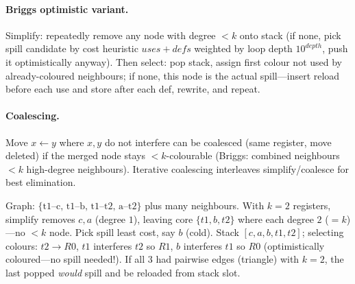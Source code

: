 \paragraph{Briggs optimistic variant.} Simplify: repeatedly remove any node with degree $<k$ onto stack (if none, pick spill candidate by cost heuristic $uses+defs$ weighted by loop depth $10^{depth}$, push it optimistically anyway). Then select: pop stack, assign first colour not used by already-coloured neighbours; if none, this node is the actual spill---insert reload before each use and store after each def, rewrite, and repeat.

\paragraph{Coalescing.} Move $x\gets y$ where $x,y$ do not interfere can be coalesced (same register, move deleted) if the merged node stays $<k$-colourable (Briggs: combined neighbours $<k$ high-degree neighbours). Iterative coalescing interleaves simplify/coalesce for best elimination.

\begin{example}
Graph: $\{\text{t1--c, t1--b, t1--t2, a--t2}\}$ plus many neighbours. With $k=2$ registers, simplify removes $c,a$ (degree $1$), leaving core $\{t1,b,t2\}$ where each degree $2$ ($=k$)---no $<k$ node. Pick spill least cost, say $b$ (cold). Stack $[c,a,b,t1,t2]$; selecting colours: $t2\to R0$, $t1$ interferes $t2$ so $R1$, $b$ interferes $t1$ so $R0$ (optimistically coloured---no spill needed!). If all 3 had pairwise edges (triangle) with $k=2$, the last popped \emph{would} spill and be reloaded from stack slot.
\end{example}


